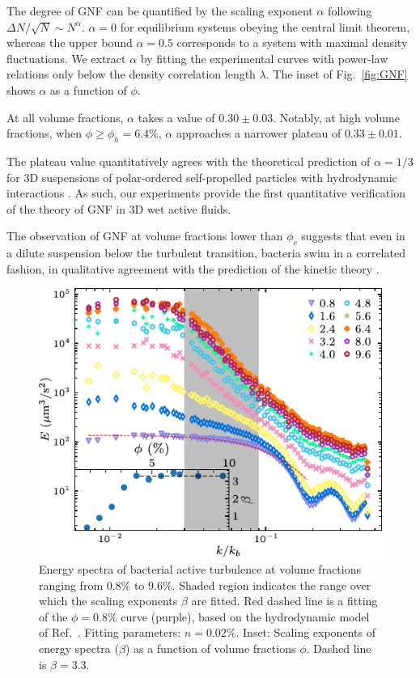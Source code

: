 The degree of GNF can be quantified by the scaling exponent $\alpha$ following $\Delta N/\sqrt{N} \sim N^\alpha$. $\alpha=0$ for equilibrium systems obeying the central limit theorem, whereas the upper bound $\alpha = 0.5$ corresponds to a system with maximal density fluctuations.
We extract $\alpha$ by fitting the experimental curves with power-law relations only below the density correlation length $\lambda$. The inset of Fig.~\ref{fig:GNF} shows $\alpha$ as a function of $\phi$.

At all volume fractions, $\alpha$ takes a value of $0.30 \pm 0.03$. Notably, at high volume fractions, when $\phi \geq \phi_h = 6.4\%$, $\alpha$ approaches a narrower plateau of $0.33 \pm 0.01$.

The plateau value quantitatively agrees with the theoretical prediction of $\alpha = 1/3$ for 3D suspensions of polar-ordered self-propelled particles with hydrodynamic interactions \cite{AditiSimha2002}. As such, our experiments provide the first quantitative verification of the theory of GNF in 3D wet active fluids.

The observation of GNF at volume fractions lower than $\phi_c$ suggests that even in a dilute suspension below the turbulent transition, bacteria swim in a correlated fashion, in qualitative agreement with the prediction of the kinetic theory \cite{Stenhammar2017}.


\begin{figure}[!h]
\begin{center}
\includegraphics[width=4.5in]{figs/5-GNF/5.pdf}
\caption[Energy spectra in active turbulence]
{
Energy spectra of bacterial active turbulence at volume fractions ranging from 0.8\% to 9.6\%. Shaded region indicates the range over which the scaling exponents $\beta$ are fitted. Red dashed line is a fitting of the $\phi=0.8\%$ curve (purple), based on the hydrodynamic model of Ref.~\cite{Bardfalvy2019}. Fitting parameters: $n=0.02\%$.
Inset: Scaling exponents of energy spectra ($\beta$) as a function of volume fractions $\phi$. Dashed line is $\beta=3.3$.
}
\label{fig:energy-spectra}
\end{center}
\end{figure}



